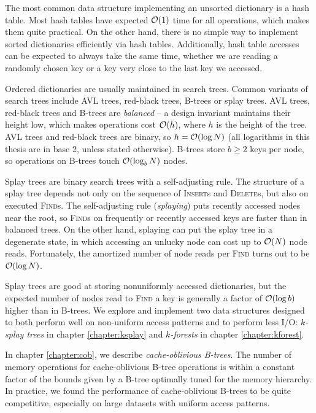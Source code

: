 The most common data structure implementing an unsorted dictionary is a hash
table. Most hash tables have expected $\mathcal{O}(1)$ time for all operations, which
makes them quite practical. On the other hand, there is no simple way to
implement sorted dictionaries efficiently via hash tables. Additionally,
hash table accesses can be expected to always take the same time, whether
we are reading a randomly chosen key or a key very close to the last key we
accessed.

Ordered dictionaries are usually maintained in search trees. Common variants
of search trees include AVL trees, red-black trees, B-trees or splay trees.
AVL trees, red-black trees and B-trees are \textit{balanced} -- a design
invariant maintains their height low, which makes operations cost $\mathcal{O}(h)$, where
$h$ is the height of the tree. AVL trees and red-black trees are binary,
so $h=\mathcal{O}(\log N)$ (all logarithms in this thesis are in base 2, unless stated
otherwise). B-trees store $b\geq 2$ keys per node, so operations on B-trees
touch $\mathcal{O}(\log_b N)$ nodes.

Splay trees are binary search trees with a self-adjusting rule.
The structure of a splay tree depends not only on the sequence of
\textsc{Insert}s and \textsc{Delete}s, but also on executed \textsc{Find}s.
The self-adjusting rule (\textit{splaying}) puts recently accessed nodes
near the root, so \textsc{Find}s on frequently or recently accessed keys
are faster than in balanced trees. On the other hand, splaying can put
the splay tree in a degenerate state, in which accessing an unlucky node can
cost up to $\mathcal{O}(N)$ node reads. Fortunately, the amortized number of node
reads per \textsc{Find} turns out to be $\mathcal{O}(\log N)$.

Splay trees are good at storing nonuniformly accessed dictionaries, but
the expected number of nodes read to \textsc{Find} a key is generally a factor
of $\mathcal{O}(\log b)$ higher than in B-trees. We explore and implement two
data structures designed to both perform well on non-uniform access patterns
and to perform less I/O: \textit{$k$-splay trees} in chapter
\ref{chapter:ksplay} and \textit{$k$-forests} in chapter \ref{chapter:kforest}.

In chapter \ref{chapter:cob}, we describe \textit{cache-oblivious B-trees}.
The number of memory operations for cache-oblivious B-tree operations
is within a constant factor of the bounds given by a B-tree optimally tuned
for the memory hierarchy. In practice, we found the performance of
cache-oblivious B-trees to be quite competitive, especially on large datasets
with uniform access patterns.
